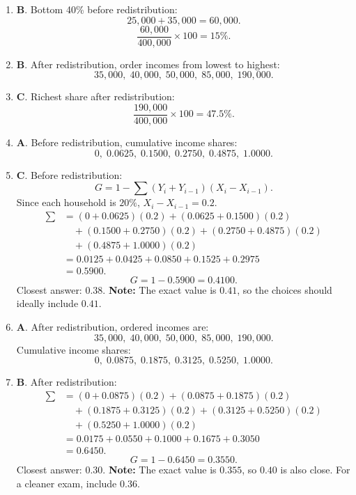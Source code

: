 \documentclass[12pt]{article}
\begin{document}
\begin{enumerate}
\item \textbf{B}. Bottom 40\% before redistribution:
\[
25,000+35,000=60,000.
\]
\[
\frac{60,000}{400,000}\times100=15\%.
\]

\item \textbf{B}. After redistribution, order incomes from lowest to highest:
\[
35,000,\;40,000,\;50,000,\;85,000,\;190,000.
\]

\item \textbf{C}. Richest share after redistribution:
\[
\frac{190,000}{400,000}\times100=47.5\%.
\]

\item \textbf{A}. Before redistribution, cumulative income shares:
\[
0,\;0.0625,\;0.1500,\;0.2750,\;0.4875,\;1.0000.
\]

\item \textbf{C}. Before redistribution:
\[
G=1-\sum(Y_i+Y_{i-1})(X_i-X_{i-1}).
\]
Since each household is \(20\%\), \(X_i-X_{i-1}=0.2\).
\[
\begin{aligned}
\sum &= (0+0.0625)(0.2)+(0.0625+0.1500)(0.2)\\
&\quad +(0.1500+0.2750)(0.2)+(0.2750+0.4875)(0.2)\\
&\quad +(0.4875+1.0000)(0.2)\\
&=0.0125+0.0425+0.0850+0.1525+0.2975\\
&=0.5900.
\end{aligned}
\]
\[
G=1-0.5900=0.4100.
\]
Closest answer: \(0.38\).  
\textbf{Note:} The exact value is \(0.41\), so the choices should ideally include \(0.41\).

\item \textbf{A}. After redistribution, ordered incomes are:
\[
35,000,\;40,000,\;50,000,\;85,000,\;190,000.
\]
Cumulative income shares:
\[
0,\;0.0875,\;0.1875,\;0.3125,\;0.5250,\;1.0000.
\]

\item \textbf{B}. After redistribution:
\[
\begin{aligned}
\sum &= (0+0.0875)(0.2)+(0.0875+0.1875)(0.2)\\
&\quad +(0.1875+0.3125)(0.2)+(0.3125+0.5250)(0.2)\\
&\quad +(0.5250+1.0000)(0.2)\\
&=0.0175+0.0550+0.1000+0.1675+0.3050\\
&=0.6450.
\end{aligned}
\]
\[
G=1-0.6450=0.3550.
\]
Closest answer: \(0.30\).  
\textbf{Note:} The exact value is \(0.355\), so \(0.40\) is also close. For a cleaner exam, include \(0.36\).


\end{enumerate}
\end{document}
